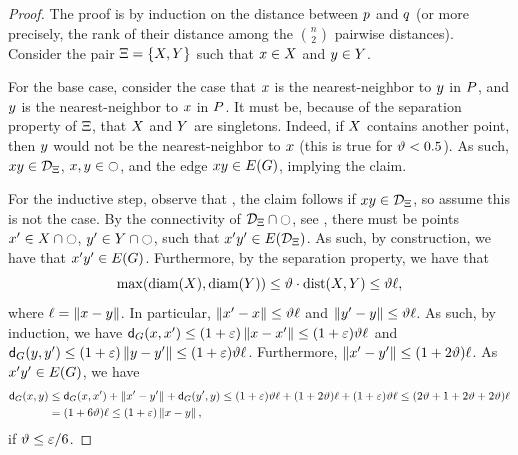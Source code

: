 \documentclass[12pt]{article}%
\begin{document}
\begin{proof}
    The proof is by induction on the distance between $p$ and $q$
    (or more precisely, the rank of their distance among the
    $\binom{n}{2}$ pairwise distances).  Consider the pair
    $\Xi = \{ X, Y \}$ such that $x \in X$ and
    $y \in Y$.

    For the base case, consider the case that $x$ is the
    nearest-neighbor to $y$ in $P$, and $y$ is the
    nearest-neighbor to $x$ in $P$.  It must be, because of the
    separation property of $\Xi$, that $X$ and $Y$ are
    singletons. Indeed, if $X$ contains another point, then $y$
    would not be the nearest-neighbor to $x$ (this is true for
    $\vartheta < 0.5$). As such, $x y \in \mathcal{D}_\Xi$,
    $x, y \in \ocircle$, and the edge $\px \py \in \EGX{\G}$,
    implying the claim.

    For the inductive step, observe that , the claim follows if
    $x y \in \mathcal{D}_\Xi$, so assume this is not the case. By the
    connectivity of $\mathcal{D}_\Xi \cap \ocircle$, see
    , there must be points
    $x' \in X \cap \ocircle$, $y' \in Y \cap \ocircle$, such that
    $\px'\py' \in \EGX{ \DT_\Pair}$. As such, by construction, we have
    that $\px'\py' \in \EGX{\G}$. Furthermore, by the separation
    property, we have that    
    \begin{equation*}
        \max \pth{ \diameterX{\PSX}, \diameterX{\PSY} }%
        \leq%
        \epsA \cdot \DistSetY{\PSX}{\PSY}%
        \leq%
        \epsA \ell, 
    \end{equation*}
    where $\ell = \left\| x - y \right\|$. In particular,
    $\left\| x' - x \right\| \leq \vartheta \ell$ and
    $\left\| y' - y \right\| \leq \vartheta \ell$. As such, by induction, we have
    $\dGZ{\G}{\px}{\px'} \leq (1+\eps)\dY{\px}{\px'} \leq
    (1+\eps)\epsA \ell$ and
    $\dGZ{\G}{\py}{\py'} \leq (1+\eps)\dY{\py}{\py'} \leq
    (1+\eps)\epsA \ell$.  Furthermore,
    $\left\| x' - y' \right\| \leq (1+2\vartheta)\ell$. As $\px'\py' \in \EGX{\G}$,
    we have
    \begin{align*}
      \dGZ{\G}{\px}{\py}%
      &\leq%
        \dGZ{\G}{\px}{\px'}%
        +\dY{\px'}{\py'}
        +
        \dGZ{\G}{\py'}{\py}%
        \leq%
        (1+\eps)\epsA \ell
        +(1+2\epsA)\ell
        + (1+\eps)\epsA \ell
        \leq%
        \pth{ 2\epsA +1+2\epsA + 2\epsA } \ell        
      \\&%
      =%
      \pth{ 1+ 6\epsA  } \ell        
      \leq%
      \pth{ 1+ \eps  } \dY{\px}{\py},
    \end{align*}
    if $\vartheta \leq \varepsilon/6$.
\end{proof}
\end{document}
